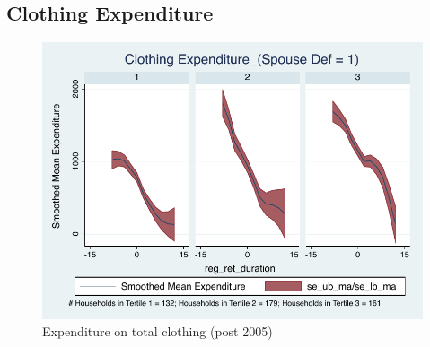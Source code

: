 \documentclass[a4paper]{article}
\begin{document}
\clearpage

\subsection{Clothing Expenditure}
\begin{table}[h]
	\centering
	
\end{table}

\begin{figure}[h]
	\caption{Expenditure on total clothing (post 2005)}
	\centering
	\includegraphics[width=1.0\textwidth]{../ConsumptionPostRetirement_by_SpouseDef_Cats/Smoothed/1/spouse_def_total_clothing_2005_real.pdf}
\end{figure}

\clearpage
\end{document}
